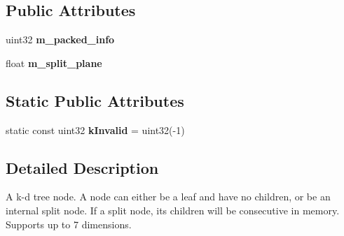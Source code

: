 \subsection*{\-Public \-Attributes}
\begin{DoxyCompactItemize}
\item 
\hypertarget{structnih_1_1_kd__node_ae0a6a4ce3de8a3dc5c4fbeb6f03a9414}{
uint32 {\bfseries m\-\_\-packed\-\_\-info}}
\label{structnih_1_1_kd__node_ae0a6a4ce3de8a3dc5c4fbeb6f03a9414}

\item 
\hypertarget{structnih_1_1_kd__node_ae2e1ffe17f5358536a749ab65b3238fc}{
float {\bfseries m\-\_\-split\-\_\-plane}}
\label{structnih_1_1_kd__node_ae2e1ffe17f5358536a749ab65b3238fc}

\end{DoxyCompactItemize}
\subsection*{\-Static \-Public \-Attributes}
\begin{DoxyCompactItemize}
\item 
\hypertarget{structnih_1_1_kd__node_af76cdc6cf213309f00fa480b4192af08}{
static const uint32 {\bfseries k\-Invalid} = uint32(-\/1)}
\label{structnih_1_1_kd__node_af76cdc6cf213309f00fa480b4192af08}

\end{DoxyCompactItemize}


\subsection{\-Detailed \-Description}
\-A k-\/d tree node. \-A node can either be a leaf and have no children, or be an internal split node. \-If a split node, its children will be consecutive in memory. \-Supports up to 7 dimensions. 


